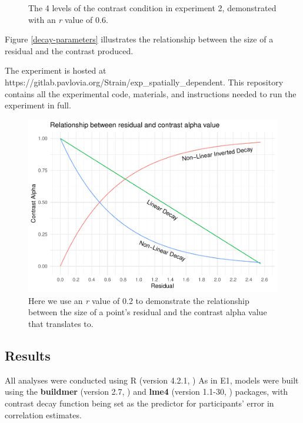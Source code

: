 \documentclass[preprint, 3p,
authoryear]{elsarticle} %
\begin{document}
\begin{figure}
\caption{\label{e2-example-plots}The 4 levels of the contrast condition in experiment 2, demonstrated with an \textit{r} value of 0.6.}\label{fig:e2-example-plots}
\end{figure}

Figure \ref{decay-parameters} illustrates the relationship between the
size of a residual and the contrast produced.

The experiment is hosted at
https://gitlab.pavlovia.org/Strain/exp\_spatially\_dependent. This
repository contains all the experimental code, materials, and
instructions needed to run the experiment in full.

\begin{figure}
\includegraphics[width=1\linewidth]{contrast_and_scatterplots_files/figure-latex/decay-parameters-1} \caption{\label{decay-parameters}Here we use an \textit{r} value of 0.2 to demonstrate the relationship between the size of a point's residual and the contrast alpha value that translates to.}\label{fig:decay-parameters}
\end{figure}

\hypertarget{results-1}{%
\subsection{Results}\label{results-1}}

All analyses were conducted using R (version 4.2.1, \citealp{r_core}) As
in E1, models were built using the \textbf{buildmer} (version 2.7,
\citealp{voeten_buildmer_2022}) and \textbf{lme4} (version 1.1-30,
\citealp{bates_lme4_2015}) packages, with contrast decay function being
set as the predictor for participants' error in correlation estimates.
\end{document}
